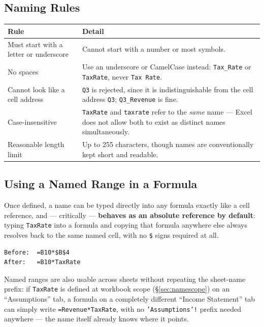 \documentclass[11pt,a4paper]{article}
\begin{document}
\subsection{Naming Rules}

\begin{center}
\begin{tabular}{@{}L{4.4cm}L{7.4cm}@{}}
\toprule
\textbf{Rule} & \textbf{Detail} \\
\midrule
Must start with a letter or underscore & Cannot start with a number or most symbols. \\
No spaces & Use an underscore or CamelCase instead: \texttt{Tax\_Rate} or \texttt{TaxRate}, never \texttt{Tax Rate}. \\
Cannot look like a cell address & \texttt{Q3} is rejected, since it is indistinguishable from the cell address \texttt{Q3}; \texttt{Q3\_Revenue} is fine. \\
Case-insensitive & \texttt{TaxRate} and \texttt{taxrate} refer to the \emph{same} name --- Excel does not allow both to exist as distinct names simultaneously. \\
Reasonable length limit & Up to 255 characters, though names are conventionally kept short and readable. \\
\bottomrule
\end{tabular}
\end{center}

\subsection{Using a Named Range in a Formula}

Once defined, a name can be typed directly into any formula exactly like a cell reference, and --- critically --- \textbf{behaves as an absolute reference by default}: typing \texttt{TaxRate} into a formula and copying that formula anywhere else always resolves back to the same named cell, with no \texttt{\$} signs required at all.

\begin{lstlisting}[style=excelstyle, caption={Before and after naming a tax-rate assumption cell}]
Before:  =B10*$B$4
After:   =B10*TaxRate
\end{lstlisting}

\begin{financeapp}
Named ranges are also usable across sheets without repeating the sheet-name prefix: if \texttt{TaxRate} is defined at workbook scope (\S\ref{sec:namescope}) on an ``Assumptions'' tab, a formula on a completely different ``Income Statement'' tab can simply write \texttt{=Revenue*TaxRate}, with no \texttt{'Assumptions'!} prefix needed anywhere --- the name itself already knows where it points.
\end{financeapp}
\end{document}
